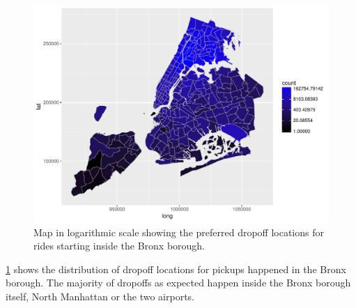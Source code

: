 \documentclass{acm_proc_article-sp-sigmod09}
\begin{document}
\begin{figure}
	\centering
	\includegraphics[width=1\columnwidth]{resources/base_plots/bronx_dropoff_location_id_dist_map.pdf}
	\caption{Map in logarithmic scale showing the preferred dropoff locations for rides starting inside the Bronx borough.}
	\label{fig:bronxDropoffMap}
\end{figure}

\cref{fig:bronxDropoffMap} shows the distribution of dropoff locations for pickups happened in the Bronx borough. The majority of dropoffs as expected happen inside the Bronx borough itself, North Manhattan or the two airports.
\end{document}
